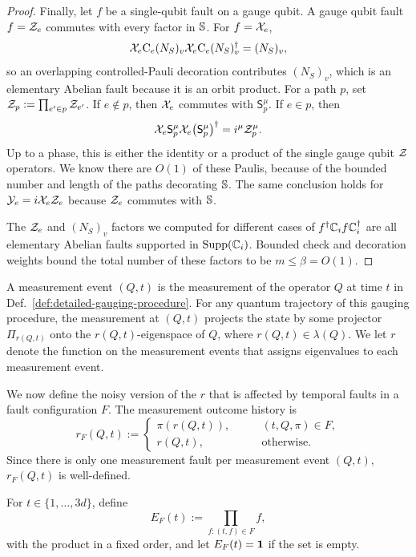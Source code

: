 \documentclass[11pt]{article}
\begin{document}
\begin{proof}
    Finally, let $f$ be a single-qubit fault on a gauge qubit. 
    A gauge qubit fault $f=\mathcal{Z}_e$ commutes with every factor in $\mathbb{S}$.
    For $f=\mathcal{X}_e$,
    \[
    \mathcal{X}_e\mathrm{C}_e ({N_S})_v \mathcal{X}_e\mathrm{C}_e ({N_S})_v ^\dagger = ({N_S})_v,
    \]
    so an overlapping controlled-Pauli decoration contributes $({N_S})_v$, which is an elementary Abelian fault because it is an orbit product.
    For a path $p$, set
    $\mathcal{Z}_p:=\prod_{e'\in p}\mathcal{Z}_{e'}$.
    If $e\notin p$, then $\mathcal{X}_e$ commutes with $\mathsf{S}_p^\mu$. If $e\in p$, then 
    \[
    \mathcal{X}_e\mathsf S_p^\mu\mathcal{X}_e
    \bigl(\mathsf S_p^\mu\bigr)^\dagger
      =i^\mu\mathcal{Z}_p^\mu.
    \]
    Up to a phase, this is either the identity or a product of the single gauge qubit $\mathcal{Z}$ operators. 
    We know there are $O(1)$ of these Paulis, because of the bounded number and length of the paths decorating $\mathbb{S}$.
    The same conclusion holds for $\mathcal{Y}_e = i \mathcal{X}_e \mathcal{Z}_e$ because $\mathcal{Z}_e$ commutes with $\mathbb{S}$.

    The $\mathcal{Z}_e$ and  $({N_S})_v$ factors we computed for different cases of $f^\dagger \mathbb{C}_{i} f \mathbb{C}_{i}^\dagger$ are all elementary Abelian faults supported in $\operatorname{Supp}(\mathbb{C}_{i})$.
    Bounded check and decoration weights bound the total number of these factors to be $m\le \beta = O(1)$.
\end{proof}

A measurement event $(Q,t)$ is the measurement of the operator $Q$ at time $t$ in Def.~\ref{def:detailed-gauging-procedure}.
For any quantum trajectory of this gauging procedure, the measurement at $(Q,t)$ projects the state by some projector $\Pi_{r(Q,t)}$ onto the $r(Q,t)$-eigenspace of $Q$, where $r(Q,t)\in \lambda(Q)$.
We let $r$ denote the function on the measurement events that assigns eigenvalues to each measurement event.

We now define the noisy version of the $r$ that is affected by temporal faults in a fault configuration $F$.
The measurement outcome history is
\[
r_F(Q,t) :=\begin{cases}
    \pi(r(Q,t)),\qquad &(t,Q,\pi)\in F,\\
    r(Q,t),\qquad &\mathrm{otherwise}.
\end{cases} 
\]
Since there is only one measurement fault per measurement event $(Q,t)$, $r_F(Q,t)$ is well-defined.

For $t\in \{1,\dots, 3d\}$, define
\[
E_F(t) := \prod_{f:(t,f)\in F} f,
\]
with the product in a fixed order, and let $E_F(t) = \mathbf{1}$ if the set is empty.
\end{document}
